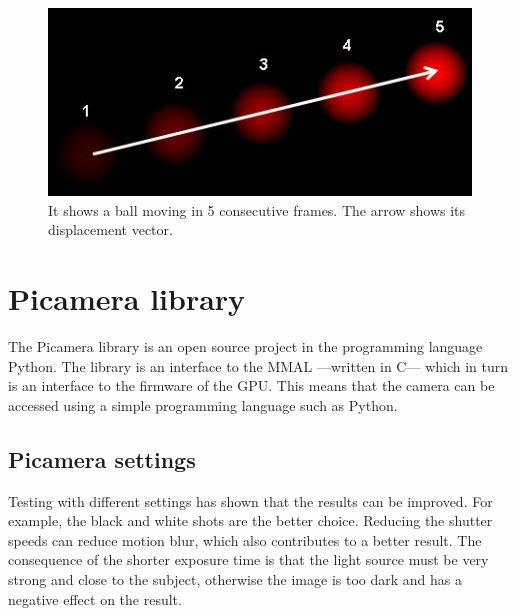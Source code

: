 \documentclass[12pt, a4paper]{report}
\begin{document}
    \bigskip
    \noindent
    \begin{figure}
    \centering
    \includegraphics[scale=0.3]{Images/optical_flow_basic1.jpg}
    
    \caption{It shows a ball moving in 5 consecutive frames. The arrow shows its displacement vector.}
    \end{figure}
    
    
    \bigskip
    
    \newpage
    
    \section{Picamera library}
    The Picamera library is an open source project in the programming language Python. The library is an interface to the MMAL ---written in C--- which in turn is an interface to the firmware of the GPU.
    This means that the camera can be accessed using a simple programming language such as Python.
    
    \subsection {Picamera settings}
    Testing with different settings has shown that the results can be improved. For example, the black and white shots are the better choice. Reducing the shutter speeds can reduce motion blur, which also contributes to a better result.
    The consequence of the shorter exposure time is that the light source must be very strong and close to the subject, otherwise the image is too dark and has a negative effect on the result.
    
    
\end{document}
